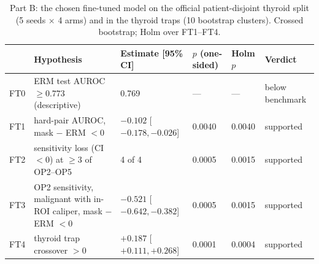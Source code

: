 \begin{table}[H]\centering\scriptsize
\caption{Part B: the chosen fine-tuned model on the official patient-disjoint thyroid split (5 seeds $\times$ 4 arms) and in the thyroid traps (10 bootstrap clusters). Crossed bootstrap; Holm over FT1--FT4.}\label{tab:s16ft}
\begin{tabular}{lp{5.4cm}p{3.0cm}p{1.3cm}p{1.1cm}p{1.9cm}}\toprule
 & Hypothesis & Estimate [95\% CI] & $p$ (one-sided) & Holm $p$ & Verdict \\\midrule
FT0 & ERM test AUROC $\ge0.773$ (descriptive) & 0.769 & --- & --- & below benchmark \\
FT1 & hard-pair AUROC, mask $-$ ERM $<0$ & $-0.102$ [$-0.178, -0.026$] & 0.0040 & 0.0040 & supported \\
FT2 & sensitivity loss (CI $<0$) at $\ge3$ of OP2--OP5 & 4 of 4 & 0.0005 & 0.0015 & supported \\
FT3 & OP2 sensitivity, malignant with in-ROI caliper, mask $-$ ERM $<0$ & $-0.521$ [$-0.642, -0.382$] & 0.0005 & 0.0015 & supported \\
FT4 & thyroid trap crossover $>0$ & $+0.187$ [$+0.111, +0.268$] & 0.0001 & 0.0004 & supported \\
\bottomrule\end{tabular}
\end{table}
